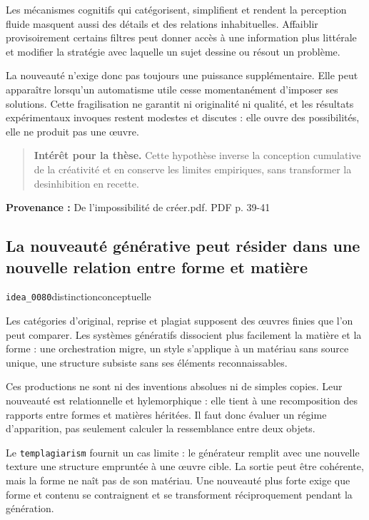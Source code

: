 \documentclass[10pt,a4paper]{article}
\begin{document}
Les mécanismes cognitifs qui catégorisent, simplifient et rendent la perception fluide masquent aussi des détails et des relations inhabituelles. Affaiblir provisoirement certains filtres peut donner accès à une information plus littérale et modifier la stratégie avec laquelle un sujet dessine ou résout un problème.

La nouveauté n'exige donc pas toujours une puissance supplémentaire. Elle peut apparaître lorsqu'un automatisme utile cesse momentanément d'imposer ses solutions. Cette fragilisation ne garantit ni originalité ni qualité, et les résultats expérimentaux invoques restent modestes et discutes : elle ouvre des possibilités, elle ne produit pas une œuvre.

\begin{quote}
\textbf{Intérêt pour la thèse.} Cette hypothèse inverse la conception cumulative de la créativité et en conserve les limites empiriques, sans transformer la desinhibition en recette.
\end{quote}
{\footnotesize\color{metadata}\textbf{Provenance :} De l'impossibilité de créer.pdf. PDF p. 39-41\par}

\subsection{La nouveauté générative peut résider dans une nouvelle relation entre forme et matière}
{\small\color{metadata} \texttt{idea\_0080}\quad\textbullet\quad distinction\quad\textbullet\quad conceptuelle\par}

Les catégories d'original, reprise et plagiat supposent des œuvres finies que l'on peut comparer. Les systèmes génératifs dissocient plus facilement la matière et la forme : une orchestration migre, un style s'applique à un matériau sans source unique, une structure subsiste sans ses éléments reconnaissables.

Ces productions ne sont ni des inventions absolues ni de simples copies. Leur nouveauté est relationnelle et hylemorphique : elle tient à une recomposition des rapports entre formes et matières héritées. Il faut donc évaluer un régime d'apparition, pas seulement calculer la ressemblance entre deux objets.

Le \texttt{templagiarism} fournit un cas limite : le générateur remplit avec une nouvelle texture une structure empruntée à une œuvre cible. La sortie peut être cohérente, mais la forme ne naît pas de son matériau. Une nouveauté plus forte exige que forme et contenu se contraignent et se transforment réciproquement pendant la génération.
\end{document}

